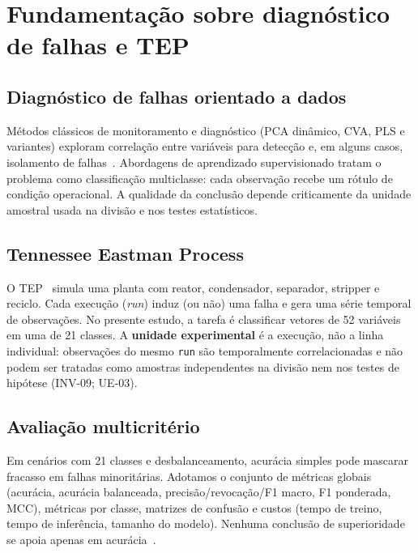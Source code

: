 \documentclass[11pt,a4paper]{article}
\begin{document}
\section{Fundamentação sobre diagnóstico de falhas e TEP}
\label{sec:fundamentacao}

\subsection{Diagnóstico de falhas orientado a dados}

Métodos clássicos de monitoramento e diagnóstico (PCA dinâmico, CVA, PLS e
variantes) exploram correlação entre variáveis para detecção e, em alguns casos,
isolamento de falhas~\cite{russell2000fault,chiang2001fault}. Abordagens de
aprendizado supervisionado tratam o problema como classificação multiclasse:
cada observação recebe um rótulo de condição operacional. A qualidade da
conclusão depende criticamente da unidade amostral usada na divisão e nos testes
estatísticos.

\subsection{Tennessee Eastman Process}

O TEP~\cite{downs1993tep} simula uma planta com reator, condensador, separador,
stripper e reciclo. Cada execução (\emph{run}) induz (ou não) uma falha e gera
uma série temporal de observações. No presente estudo, a tarefa é classificar
vetores de 52 variáveis em uma de 21 classes. A \textbf{unidade experimental} é
a execução, não a linha individual: observações do mesmo \texttt{run} são
temporalmente correlacionadas e não podem ser tratadas como amostras
independentes na divisão nem nos testes de hipótese (INV-09; UE-03).

\subsection{Avaliação multicritério}

Em cenários com 21 classes e desbalanceamento, acurácia simples pode mascarar
fracasso em falhas minoritárias. Adotamos o conjunto de métricas globais
(acurácia, acurácia balanceada, precisão/revocação/F1 macro, F1 ponderada, MCC),
métricas por classe, matrizes de confusão e custos (tempo de treino, tempo de
inferência, tamanho do modelo). Nenhuma conclusão de superioridade se apoia
apenas em acurácia~\cite{matthews1975mcc}.
\end{document}
